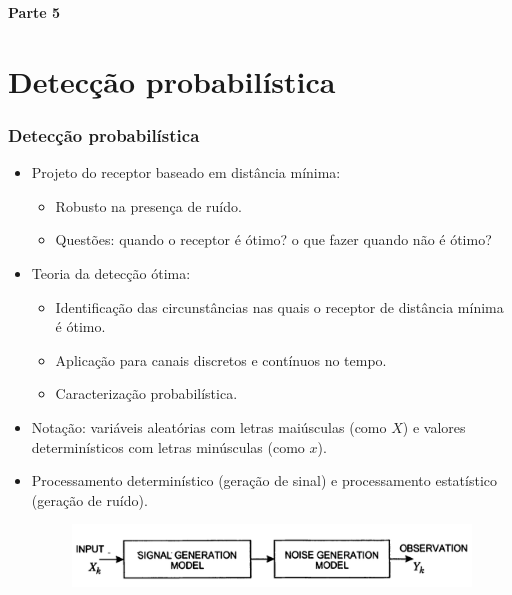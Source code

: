 
\begin{frame}
	\begin{block}{\centering\large\bfseries Parte 5}
		\centering\large\insertpart
	\end{block}
\end{frame}

\section{Detecção probabilística}

\begin{frame}
	\frametitle{Detecção probabilística}

	\begin{itemize}
	    \item Projeto do receptor baseado em distância mínima:
	    \begin{itemize}
	      \item Robusto na presença de ruído.
	      \item Questões: quando o receptor é ótimo? o que fazer quando não é ótimo?
	    \end{itemize}
	    \item Teoria da detecção ótima:
	    \begin{itemize}
	      \item Identificação das circunstâncias nas quais o receptor de distância mínima é ótimo.
	      \item Aplicação para canais discretos e contínuos no tempo.
	      \item Caracterização probabilística.
	    \end{itemize}
	    \item Notação: variáveis aleatórias com letras maiúsculas (como $X$) e valores determinísticos com letras minúsculas (como $x$).
	    \item Processamento determinístico (geração de sinal) e processamento estatístico (geração de ruído).
	    \begin{figure}[t]	
	      \begin{center}
		\includegraphics[width=0.65\columnwidth]{figs/detec_01}
	      \end{center}
	    \end{figure}
	\end{itemize}			
\end{frame}


